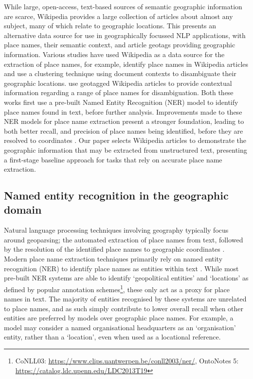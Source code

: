 \documentclass[]{interact}
\theoremstyle{plain}%
\theoremstyle{definition}
\theoremstyle{remark}
\begin{document}
While large, open-access, text-based sources of semantic geographic
information are scarce, Wikipedia provides a large collection of
articles about almost any subject, many of which relate to geographic
locations. This presents an alternative data source for use in
geographically focussed NLP applications, with place names, their
semantic context, and article geotags providing geographic information.
Various studies have used Wikipedia as a data source for the extraction
of place names, \citet{delozier2015} for example, identify place names
in Wikipedia articles and use a clustering technique using document
contexts to disambiguate their geographic locations.
\citet{speriosu2013} use geotagged Wikipedia articles to provide
contextual information regarding a range of place names for
disambiguation. Both these works first use a pre-built Named Entity
Recognition (NER) model to identify place names found in text, before
further analysis. Improvements made to these NER models for place name
extraction present a stronger foundation, leading to both better recall,
and precision of place names being identified, before they are resolved
to coordinates \citep{leidner2008, purves2018}. Our paper selects
Wikipedia articles to demonstrate the geographic information that may be
extracted from unstructured text, presenting a first-stage baseline
approach for tasks that rely on accurate place name extraction.

\hypertarget{named-entity-recognition-in-the-geographic-domain}{%
\subsection{Named entity recognition in the geographic
domain}\label{named-entity-recognition-in-the-geographic-domain}}

Natural language processing techniques involving geography typically
focus around geoparsing; the automated extraction of place names from
text, followed by the resolution of the identified place names to
geographic coordinates \citep{gritta2020, leidner2008, buscaldi2011}.
Modern place name extraction techniques primarily rely on named entity
recognition (NER) to identify place names as entities within text
\citep{kumar2019, purves2018}. While most pre-built NER systems are able
to identify `geopolitical entities' and `locations' as defined by
popular annotation schemes\footnote{CoNLL03:
  \url{https://www.clips.uantwerpen.be/conll2003/ner/}, OntoNotes 5:
  \url{https://catalog.ldc.upenn.edu/LDC2013T19}}, these only act as a
proxy for place names in text. The majority of entities recognised by
these systems are unrelated to place names, and as such simply
contribute to lower overall recall when other entities are preferred by
models over geographic place names. For example, a model may consider a
named organisational headquarters as an `organisation' entity, rather
than a `location', even when used as a locational reference.
\end{document}
